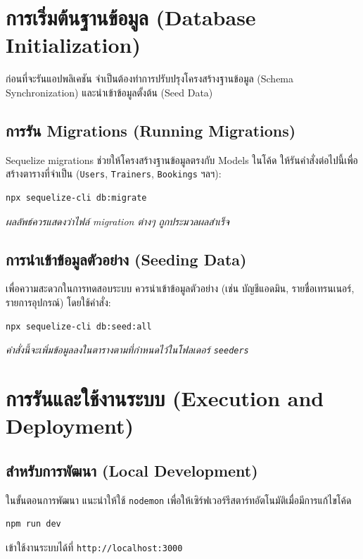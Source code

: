 \section{การเริ่มต้นฐานข้อมูล (Database Initialization)}
ก่อนที่จะรันแอปพลิเคชัน จำเป็นต้องทำการปรับปรุงโครงสร้างฐานข้อมูล (Schema Synchronization) และนำเข้าข้อมูลตั้งต้น (Seed Data)

\subsection{การรัน Migrations (Running Migrations)}
Sequelize migrations ช่วยให้โครงสร้างฐานข้อมูลตรงกับ Models ในโค้ด ให้รันคำสั่งต่อไปนี้เพื่อสร้างตารางที่จำเป็น (\texttt{Users}, \texttt{Trainers}, \texttt{Bookings} ฯลฯ):
\begin{lstlisting}[language=bash, frame=single]
npx sequelize-cli db:migrate
\end{lstlisting}
\textit{ผลลัพธ์ควรแสดงว่าไฟล์ migration ต่างๆ ถูกประมวลผลสำเร็จ}

\subsection{การนำเข้าข้อมูลตัวอย่าง (Seeding Data)}
เพื่อความสะดวกในการทดสอบระบบ ควรนำเข้าข้อมูลตัวอย่าง (เช่น บัญชีแอดมิน, รายชื่อเทรนเนอร์, รายการอุปกรณ์) โดยใช้คำสั่ง:
\begin{lstlisting}[language=bash, frame=single]
npx sequelize-cli db:seed:all
\end{lstlisting}
\textit{คำสั่งนี้จะเพิ่มข้อมูลลงในตารางตามที่กำหนดไว้ในโฟลเดอร์ \texttt{seeders}}

\section{การรันและใช้งานระบบ (Execution and Deployment)}

\subsection{สำหรับการพัฒนา (Local Development)}
ในขั้นตอนการพัฒนา แนะนำให้ใช้ \texttt{nodemon} เพื่อให้เซิร์ฟเวอร์รีสตาร์ทอัตโนมัติเมื่อมีการแก้ไขโค้ด
\begin{lstlisting}[language=bash, frame=single]
npm run dev
\end{lstlisting}
เข้าใช้งานระบบได้ที่ \texttt{http://localhost:3000}

